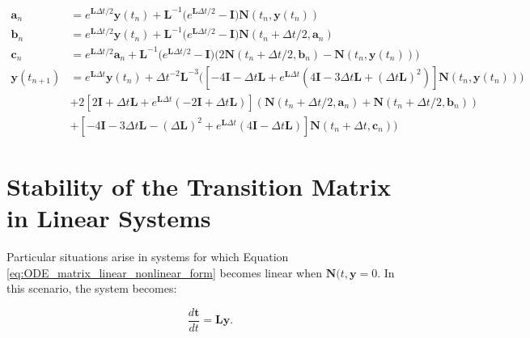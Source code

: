 \begin{equation}
\begin{split}
     \boldsymbol{a}_{n} &= e^{\boldsymbol{L}\Delta t/2}\boldsymbol{y}(t_{n}) + \boldsymbol{L}^{-1}\big(e^{\boldsymbol{L}\Delta t/2} - \boldsymbol{I} \big)\boldsymbol{N}(t_{n},\boldsymbol{y}(t_{n})) \\
    \boldsymbol{b}_{n} &= e^{\boldsymbol{L}\Delta t/2}\boldsymbol{y}(t_{n}) + \boldsymbol{L}^{-1}\big(e^{\boldsymbol{L}\Delta t/2} - \boldsymbol{I} \big)\boldsymbol{N}(t_{n}+\Delta t/2,\boldsymbol{a}_{n}) \\
     \boldsymbol{c}_{n} &= e^{\boldsymbol{L}\Delta t/2}\boldsymbol{a}_{n} + \boldsymbol{L}^{-1}\big(e^{\boldsymbol{L}\Delta t/2} - \boldsymbol{I} \big)\big(2\boldsymbol{N}(t_{n}+\Delta t/2,\boldsymbol{b} _{n}) - \boldsymbol{N}(t_{n},\boldsymbol{y}(t_{n}))\big) \\
     \boldsymbol{y}(t_{n+1}) &= e^{\boldsymbol{L}\Delta t}\boldsymbol{y}(t_{n}) + \Delta t^{-2}\boldsymbol{L}^{-3}\big([-4\boldsymbol{I} - \Delta t\boldsymbol{L} + e^{\boldsymbol{L}\Delta t}(4\boldsymbol{I} -3\Delta t\boldsymbol{L} + (\Delta t\boldsymbol{L})^{2})]\boldsymbol{N}(t_{n}, \boldsymbol{y}(t_{n}))) \\
     &+ 2[2\boldsymbol{I} + \Delta t\boldsymbol{L} + e^{\boldsymbol{L}\Delta t}(-2\boldsymbol{I} + \Delta t\boldsymbol{L})](\boldsymbol{N}(t_{n} + \Delta t/2, \boldsymbol{a}_{n}) + \boldsymbol{N}(t_{n} + \Delta t/2, \boldsymbol{b}_{n})) \\
     &+ [-4\boldsymbol{I} - 3\Delta t\boldsymbol{L} - (\Delta\boldsymbol{L})^{2} + e^{\boldsymbol{L}\Delta t}(4\boldsymbol{I} - \Delta t\boldsymbol{L})]\boldsymbol{N}(t_{n}+\Delta t, \boldsymbol{c}_{n})\big)
\end{split}
\end{equation}

\section{Stability of the Transition Matrix in Linear Systems}
Particular situations arise in systems for which Equation \ref{eq:ODE_matrix_linear_nonlinear_form} becomes linear when $\boldsymbol{N}(t,\boldsymbol{y} = 0$. In this scenario, the system becomes:

\begin{equation}
    \frac{d\boldsymbol{t}}{dt} = \boldsymbol{L}\boldsymbol{y}.
\end{equation}

